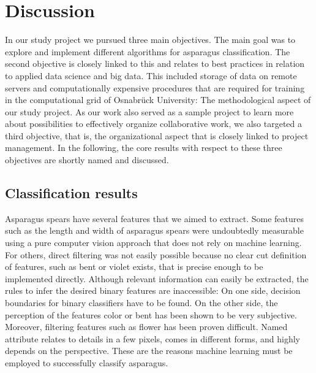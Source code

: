\section{Discussion}
\label{ch:Discussion}

In our study project we pursued three main objectives. The main goal was to explore and implement different algorithms for asparagus classification. The second objective is closely linked to this and relates to best practices in relation to applied data science and big data. This included storage of data on remote servers and computationally expensive procedures that are required for training in the computational grid of Osnabr{\"u}ck University: The methodological aspect of our study project. As our work also served as a sample project to learn more about possibilities to effectively organize collaborative work, we also targeted a third objective, that is, the organizational aspect that is closely linked to project management. In the following, the core results with respect to these three objectives are shortly named and discussed.


\subsection{Classification results}
\label{sec:DiscussionResults}

Asparagus spears have several features that we aimed to extract. Some features such as the length and width of asparagus spears were undoubtedly measurable using a pure computer vision approach that does not rely on machine learning. For others, direct filtering was not easily possible because no clear cut definition of features, such as bent or violet exists, that is precise enough to be implemented directly. Although relevant information can easily be extracted, the rules to infer the desired binary features are inaccessible: On one side, decision boundaries for binary classifiers have to be found. On the other side, the perception of the features color or bent has been shown to be very subjective. Moreover, filtering features such as flower has been proven difficult. Named attribute relates to details in a few pixels, comes in different forms, and highly depends on the perspective. These are the reasons machine learning must be employed to successfully classify asparagus.

